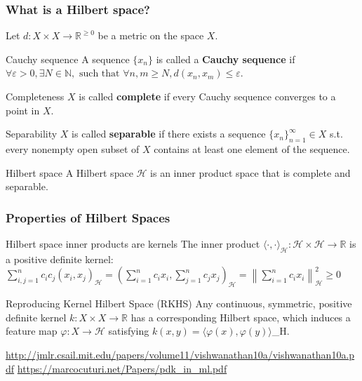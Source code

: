 \documentclass{beamer}
\begin{document}
    \begin{frame}
        \frametitle{What is a Hilbert space?}
        Let $d: X\times X \rightarrow \mathbb R^{\geq 0}$ be a metric on the space $X$. \\
        \begin{block}{Cauchy sequence}
            A sequence $\{x_n\}$ is called a \textbf{Cauchy sequence} if $\forall \varepsilon > 0, \exists N \in \mathbb{N}, \text{ such that } \forall n,m \geq N, d(x_n,x_m)\leq \varepsilon$. \\
        \end{block}
        \begin{block}{Completeness}
            $X$ is called \textbf{complete} if every Cauchy sequence converges to a point in $X$.
        \end{block}
        \begin{block}{Separability}
            $X$ is called \textbf{separable} if there exists a sequence $\{x_n\}_{n = 1}^\infty \in X$ s.t. every nonempty open subset of $X$ contains at least one element of the sequence.
        \end{block}
        \begin{block}{Hilbert space}
            A Hilbert space $\mathcal H$ is an inner product space that is complete and separable.
        \end{block}
    \end{frame}

    \begin{frame}
        \frametitle{Properties of Hilbert Spaces}
        \begin{block}{Hilbert space inner products are kernels}
            The inner product $\langle\cdot ,\cdot \rangle_{\mathcal H}:\mathcal H\times \mathcal H\to \mathbb {R}$ is a positive definite kernel:
            $\sum\limits_{i,j=1}^{n}c_{i}c_{j}(x_{i},x_{j})_{\mathcal H}=\left(\sum _{i=1}^{n}c_{i}x_{i},\sum\limits_{j=1}^{n}c_{j}x_{j}\right)_{\mathcal H}=\left\|\sum \limits_{i=1}^{n}c_{i}x_{i}\right\|_{\mathcal H}^{2}\geq 0$
        \end{block}

        \begin{block}{Reproducing Kernel Hilbert Space (RKHS)}
            Any continuous, symmetric, positive definite kernel $k: X \times X\rightarrow \mathbb R$ has a corresponding Hilbert space, which induces a feature map $\varphi: X \rightarrow \mathcal H$ satisfying $k(x,y) = \langle\varphi(x),\varphi(y)\rangle $_{\mathcal H}.
        \end{block}

        \tiny{\url{http://jmlr.csail.mit.edu/papers/volume11/vishwanathan10a/vishwanathan10a.pdf}}
        \tiny{\url{https://marcocuturi.net/Papers/pdk_in_ml.pdf}}
    \end{frame}
\end{document}
